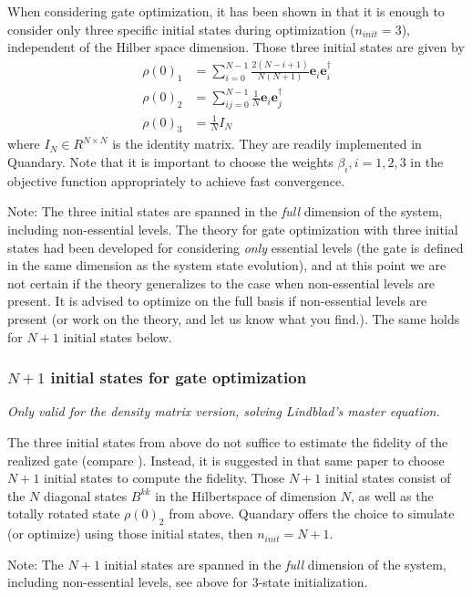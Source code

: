 \documentclass[11pt]{article}
\newcommand{\bs}[1]{{\boldsymbol{#1}}}
\begin{document}
When considering gate optimization, it has been shown in \cite{goerz2014optimal} that it is enough to consider only three specific initial states during optimization ($n_{init}=3$), independent of the Hilber space dimension. Those three initial states are given by
\begin{align}
    \rho(0)_1 &= \sum_{i=0}^{N-1} \frac{2(N-i+1)}{N(N+1)} \bs{e}_i\bs{e}_i^\dagger \\
    \rho(0)_2 &= \sum_{ij=0}^{N-1} \frac{1}{N} \bs{e}_i\bs{e}_j^\dagger\\
    \rho(0)_3 &= \frac{1}{N} I_N
\end{align}
where $I_N\in R^{N\times N}$ is the identity matrix. They are readily implemented in Quandary. Note that it is important to choose the weights $\beta_i, i=1,2,3$ in the objective function appropriately to achieve fast convergence. 

Note: The three initial states are spanned in the \textit{full} dimension of the system, including non-essential levels. The theory for gate optimization with three initial states had been developed for considering \textit{only} essential levels (the gate is defined in the same dimension as the system state evolution), and at this point we are not certain if the theory generalizes to the case when non-essential levels are present. It is advised to optimize on the full basis if non-essential levels are present (or work on the theory, and let us know what you find.). The same holds for $N+1$ initial states below. 

\subsubsection{$N+1$ initial states for gate optimization}
\textit{Only valid for the density matrix version, solving Lindblad's master equation.}


The three initial states from above do not suffice to estimate the fidelity of the realized gate (compare \cite{goerz2014optimal}). Instead, it is suggested in that same paper to choose $N+1$ initial states to compute the fidelity. Those $N+1$ initial states consist of the $N$ diagonal states $B^{kk}$ in the Hilbertspace of dimension $N$, as well as the totally rotated state $\rho(0)_2$ from above. Quandary offers the choice to simulate (or optimize) using those initial states, then $n_{init} = N+1$.

Note: The $N+1$ initial states are spanned in the \textit{full} dimension of the system, including non-essential levels, see above for 3-state initialization. 
\end{document}
